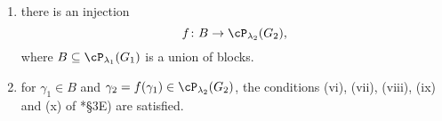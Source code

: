 \documentclass[12pt,a4paper]{amsart}
\numberwithin{equation}{section}
\theoremstyle{remark}
\begin{document}
\begin{enumerate}[KLff]
  \item there is an injection
        \[
        \ff \colon B\rightarrow \cP_{\lambda_{2}}(G_{2}),
        \]
        where $B\subseteq \cP_{\lambda_{1}}(G_{1})$ is a union of blocks.
  \item for $\gamma_{1}\in B$ and $\gamma_{2} = \ff(\gamma_{1})\in \cP_{\lambda_{2}}(G_{2})$, the conditions (vi), (vii), (viii), (ix) and (x) of \cite{GI}*{\S 3E}) are satisfied. 
  \end{enumerate}
  
\end{document}
